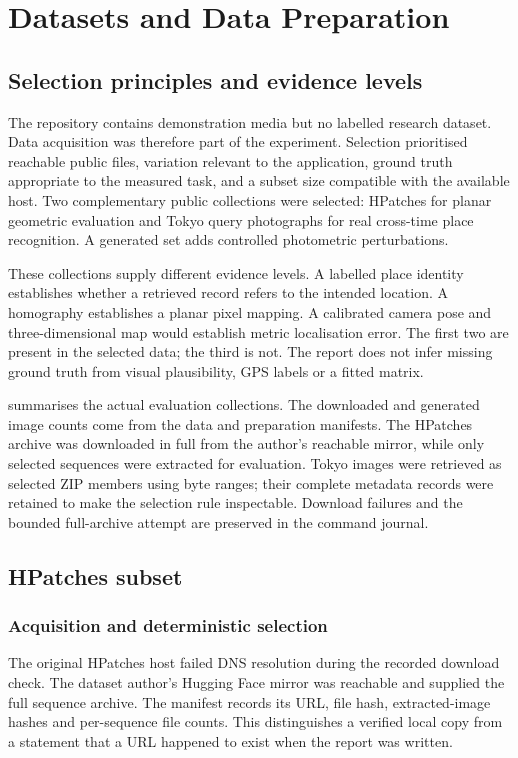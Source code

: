 \chapter{Datasets and Data Preparation}\label{ch:datasets}
\section{Selection principles and evidence levels}
The repository contains demonstration media but no labelled research dataset. Data acquisition was therefore part of the experiment. Selection prioritised reachable public files, variation relevant to the application, ground truth appropriate to the measured task, and a subset size compatible with the available host. Two complementary public collections were selected: HPatches for planar geometric evaluation and Tokyo query photographs for real cross-time place recognition. A generated set adds controlled photometric perturbations.

These collections supply different evidence levels. A labelled place identity establishes whether a retrieved record refers to the intended location. A homography establishes a planar pixel mapping. A calibrated camera pose and three-dimensional map would establish metric localisation error. The first two are present in the selected data; the third is not. The report does not infer missing ground truth from visual plausibility, GPS labels or a fitted matrix.

 summarises the actual evaluation collections. The downloaded and generated image counts come from the data and preparation manifests. The HPatches archive was downloaded in full from the author's reachable mirror, while only selected sequences were extracted for evaluation. Tokyo images were retrieved as selected ZIP members using byte ranges; their complete metadata records were retained to make the selection rule inspectable. Download failures and the bounded full-archive attempt are preserved in the command journal.

\section{HPatches subset}
\subsection{Acquisition and deterministic selection}
The original HPatches host failed DNS resolution during the recorded download check. The dataset author's Hugging Face mirror was reachable and supplied the full sequence archive. The manifest records its URL, file hash, extracted-image hashes and per-sequence file counts. This distinguishes a verified local copy from a statement that a URL happened to exist when the report was written.

